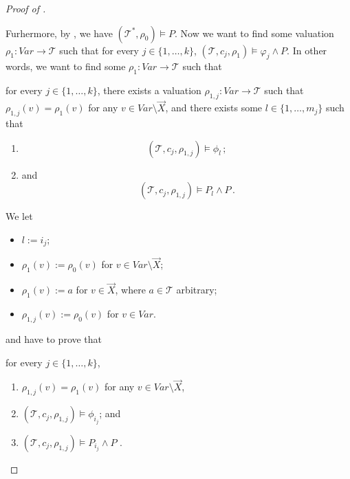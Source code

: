 \documentclass{article}
\newenvironment{proofenv}
  {
    \VerbatimEnvironment\begin{tcolorbox}[colback=black!0!white] %
  }
  {
   \end{tcolorbox}
  }
\begin{document}
\begin{proof}[Proof of ]
\begin{enumerate}
    Furhermore, by , we have $(\mathcal{T}^*, \rho_0) \vDash P$.
    Now we want to find some valuation $\rho_1 : \mathit{Var} \to \mathcal{T}$
    such that for every $j \in \{ 1, \ldots, k \}$,
    $(\mathcal{T}, c_j, \rho_1) \vDash \varphi_j \land P$.
    In other words, we want to find some $\rho_1 : \mathit{Var} \to \mathcal{T}$
    such that
    \begin{proofenv}
        for every $j \in \{ 1, \ldots, k \}$,
        there exists a valuation $\rho_{1,j} : \mathit{Var} \to \mathcal{T}$ such that
        $\rho_{1,j}(v) = \rho_1(v)$ for any $v \in \mathit{Var} \setminus \vec{X}$,
        and there exists some $l \in \{ 1, \ldots, m_j \}$ such that
        \begin{enumerate}
            \item         
            \begin{equation*}
            (\mathcal{T}, c_j, \rho_{1,j}) \vDash \phi_l \, ;
            \end{equation*}
            \item and
            \begin{equation*}
            (\mathcal{T}, c_j, \rho_{1,j}) \vDash  P_l \land P \, .
            \end{equation*}
        \end{enumerate}
    \end{proofenv}
    We let
    \begin{itemize}
        \item $l := i_j$;
        \item $\rho_1(v) := \rho_0(v)$ for $v \in \mathit{Var} \setminus \vec{X}$;
        \item $\rho_1(v) := a$ for $v \in \vec{X}$, where $a \in \mathcal{T}$ arbitrary;
        \item $\rho_{1,j}(v) := \rho_0(v)$ for $v \in \mathit{Var}$.
    \end{itemize}
    and have to prove that
    \begin{proofenv}
        for every $j \in \{ 1, \ldots, k \}$,
        \begin{enumerate}
            \item $\rho_{1,j}(v) = \rho_1(v)$ for any $v \in \mathit{Var} \setminus \vec{X}$,
            \item $(\mathcal{T}, c_j, \rho_{1,j}) \vDash \phi_{i_j} $; and
            \item $ (\mathcal{T}, c_j, \rho_{1,j}) \vDash  P_{i_j} \land P$ .
        \end{enumerate}

\end{proofenv}
\end{enumerate}
\end{proof}
\end{document}
